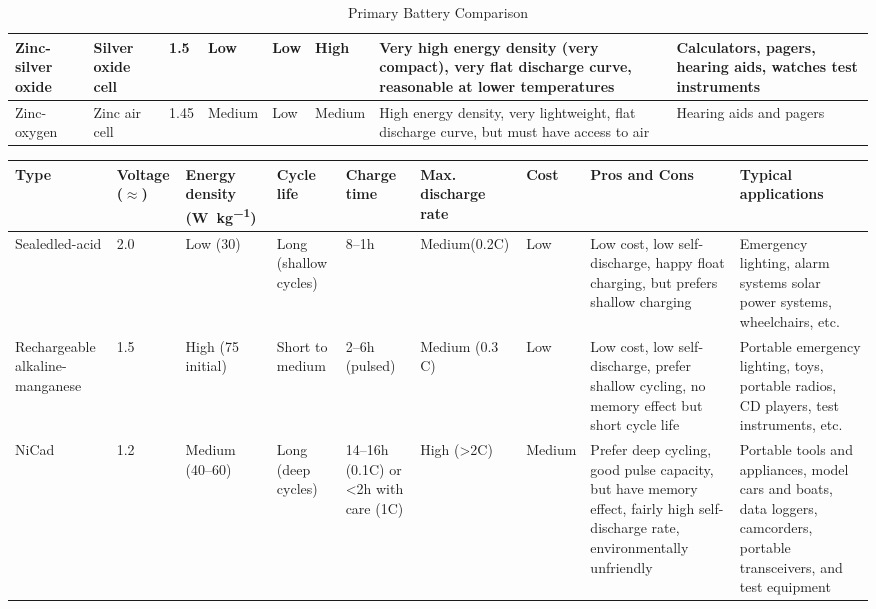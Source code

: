 \documentclass[../../document]{subfiles}
\begin{document}
\begin{sidewaystable}
\begin{center}
\begin{tabular}{p{.09\textheight}p{.07\textheight}p{.06\textheight}p{.07\textheight}p{.12\textheight}p{.05\textheight}p{.22\textheight}p{.2\textheight}}
			\midrule
			Zinc-silver oxide & Silver oxide cell & 1.5 & Low & Low & High & Very
			high energy density (very compact), very flat discharge curve,
			reasonable at lower temperatures & Calculators, pagers, hearing aids,
			watches test instruments\\
			\midrule
			Zinc-oxygen & Zinc air cell & 1.45 & Medium & Low & Medium & High energy
			density, very lightweight, flat discharge curve, but must have access to
			air & Hearing aids and pagers\\
			\bottomrule
		\end{tabular}
	\end{center}
	\caption{Primary Battery Comparison \cite[p. 278]{practical_electronics}}
\end{sidewaystable}

\begin{sidewaystable}
	\begin{center}
		\small
		\begin{tabular}{p{.06\textheight}p{.06\textheight}p{.05\textheight}p{.05\textheight}p{.06\textheight}p{.09\textheight}p{.05\textheight}p{.22\textheight}p{.2\textheight}}
			\toprule 
			Type & Voltage (\(\approx\)) & Energy density
			(\unit{\watt\per\kilogram}) & Cycle life & Charge time & Max. discharge
			rate & Cost & Pros and Cons & Typical applications\\
			\midrule
			Sealed\newline led-acid & 2.0 & Low (30) & Long (shallow cycles) &
			8–1\unit{\hour} & Medium\newline (0.2C) & Low & Low cost, low
			self-discharge, happy float charging, but prefers shallow charging &
			Emergency lighting, alarm systems solar power systems, wheelchairs,
			etc.\\
			\midrule
			Rechargeable alkaline-manganese & 1.5 & High (75 initial) & Short to
			medium & 2–6\unit{\hour} (pulsed) & Medium (0.3 C) & Low & Low cost, low
			self-discharge, prefer shallow cycling, no memory effect but short cycle
			life & Portable emergency lighting, toys, portable radios, CD players,
			test instruments, etc.\\
			\midrule
			NiCad & 1.2 & Medium (40–60) & Long (deep cycles) & 14–16\unit{\hour}
			(0.1C) or <2\unit{\hour} with care (1C) & High (>2C) & Medium & Prefer
			deep cycling, good pulse capacity, but have memory effect, fairly high
			self-discharge rate, environmentally unfriendly & Portable tools and
			appliances, model cars and boats, data loggers, camcorders, portable
			transceivers, and test equipment\\

\end{tabular}
\end{center}
\end{sidewaystable}
\end{document}
